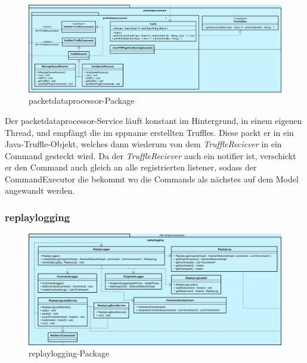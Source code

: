     \begin{figure}[H]
      \centering
      \includegraphics[width=\textwidth]{../diagramimages/packetdataprocessor.png}
      \caption{packetdataprocessor-Package}
    \end{figure}

    \medskip
    Der packetdataprocessor-Service läuft konstant im Hintergrund, in einem eigenen Thread,
    und empfängt die im \gls{sppname} erstellten Truffles.
    Diese packt er in ein Java-Truffle-Objekt, welches dann wiederum von dem
    \textit{TruffleReciever} in ein Command gesteckt wird. Da der \textit{TruffleReciever}
    auch ein \gls{notifier} ist, verschickt er den Command auch gleich an
    alle registrierten \gls{listener}, sodass der CommandExecutor die bekommt wo die Commands
    als nächstes auf dem Model angewandt werden.

    \subsubsection{replaylogging}
    \label{subsubsec:replaylogging}

    \begin{figure}[H]
      \centering
      \includegraphics[width=\textwidth]{../diagramimages/replaylogging.png}
      \caption{replaylogging-Package}
    \end{figure}

